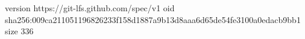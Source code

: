 version https://git-lfs.github.com/spec/v1
oid sha256:009ca211051196826233f158d1887a9b13d8aaa6d65de54fe3100a0edacb9bb1
size 336
